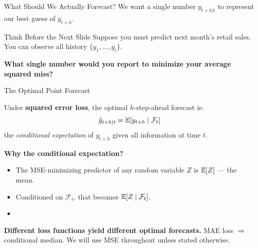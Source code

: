 \documentclass[aspectratio=169, 11pt]{beamer}
\begin{document}
\begin{frame}{What Should We Actually Forecast?}
  We want a single number $\hat{y}_{t+h|t}$ to represent our best guess of $y_{t+h}$.

  \vspace{0.5cm}
  \begin{examplebox}{Think Before the Next Slide}
    Suppose you must predict next month's retail sales.
    You can observe all history $\{y_1, \ldots, y_t\}$.

    \medskip
    \textbf{What single number would you report to minimize your average squared miss?}

    \medskip
  \end{examplebox}
\end{frame}

\begin{frame}{The Optimal Point Forecast}
  \begin{keybox}
    Under \textbf{squared error loss}, the optimal $h$-step-ahead forecast is:
    \[
      \hat{y}_{t+h|t} = \mathbb{E}[y_{t+h} \mid \mathcal{F}_t]
    \]
    the \emph{conditional expectation} of $y_{t+h}$ given all information at time $t$.
  \end{keybox}
  \vspace{0.1cm}
  \textbf{Why the conditional expectation?}
  \begin{itemize}
    \item The MSE-minimizing predictor of any random variable $Z$
          is $\mathbb{E}[Z]$ --- the mean.
    \item Conditioned on $\mathcal{F}_t$, that becomes $\mathbb{E}[Z \mid \mathcal{F}_t]$.
    \item {}
  \end{itemize}
  \begin{warningbox}
    \textbf{Different loss functions yield different optimal forecasts.}
    MAE loss $\Rightarrow$ conditional median.
    We will use MSE throughout unless stated otherwise.
  \end{warningbox}
\end{frame}
\end{document}
